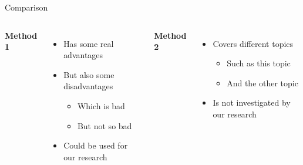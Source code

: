 \documentclass[english,american,german,aspectratio=169]{beamer}
\begin{document}
\begin{frame}{Comparison}

  \begin{columns}[t]


    \textbf{Method 1}

    \begin{itemize}
      \item Has some real advantages
      \item But also some disadvantages

        \begin{itemize}
          \item Which is bad
          \item But not so bad
        \end{itemize}
      \item Could be used for our research
    \end{itemize}


    \textbf{Method 2}

    \begin{itemize}
      \item Covers different topics

        \begin{itemize}
          \item Such as this topic
          \item And the other topic
        \end{itemize}
      \item Is not investigated by our research
    \end{itemize}
  \end{columns}

\end{frame}
\end{document}
